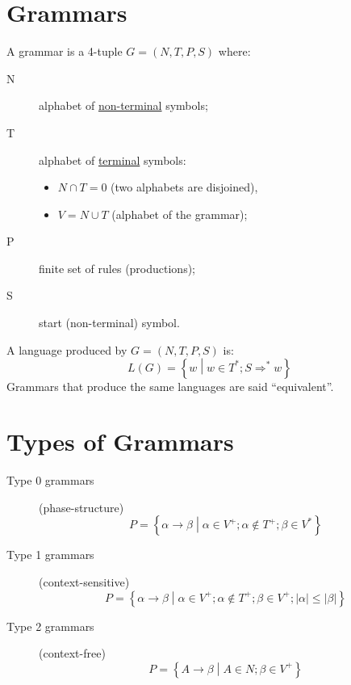 \section{Grammars}
A grammar is a 4-tuple $G = (N, T, P, S)$ where:
\begin{description}
	\item[N] alphabet of \underline{non-terminal} symbols;
	\item[T] alphabet of \underline{terminal} symbols:
	\begin{itemize}
		\item $N \cap T = 0$ (two alphabets are disjoined),
		\item $V = N \cup T$ (alphabet of the grammar);
	\end{itemize}
	\item[P] finite set of rules (productions);
	\item[S] start (non-terminal) symbol.
\end{description}

A language produced by $G = (N, T, P, S)$ is:
$$
	L(G) = \left\{w \middle| w \in T^\ast; S \Rightarrow^\ast w\right\}
$$
Grammars that produce the same languages are said ``equivalent''.

\section{Types of Grammars}
\begin{description}
	\item[Type 0 grammars] (phase-structure)
		$$
			P = \left\{\alpha \to \beta \middle| \alpha \in V^+; \alpha \notin T^+; \beta \in V^\ast \right\}
		$$
	\item[Type 1 grammars] (context-sensitive)
		$$
			P = \left\{\alpha \to \beta \middle| \alpha \in V^+; \alpha \notin T^+; \beta \in V^+; |\alpha| \leq |\beta| \right\}
		$$
	\item[Type 2 grammars] (context-free)
		$$
			P = \left\{A \to \beta \middle| A \in N; \beta \in V^+ \right\}
		$$
\end{description}

